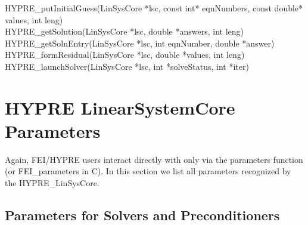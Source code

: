 \begin{tabbing}
{\sf HYPRE\_putInitialGuess(LinSysCore *lsc, const int* eqnNumbers,
                          const double* values, int leng)} \\[1mm]
{\sf HYPRE\_getSolution(LinSysCore *lsc, double *answers, int leng)} \\[1mm]

{\sf HYPRE\_getSolnEntry(LinSysCore *lsc, int eqnNumber, double *answer)} \\[1mm]

{\sf HYPRE\_formResidual(LinSysCore *lsc, double *values, int leng)} \\[1mm]

{\sf HYPRE\_launchSolver(LinSysCore *lsc, int *solveStatus, int *iter)} \\[1mm]
\end{tabbing}

\section{HYPRE LinearSystemCore Parameters}

Again, FEI/HYPRE users interact directly with \hypre{} only via the 
{\sf parameters} function (or {\sf FEI\_parameters} in C).  In this 
section we list all parameters recognized by the {\sf HYPRE\_LinSysCore}.

\subsection{Parameters for Solvers and Preconditioners}


